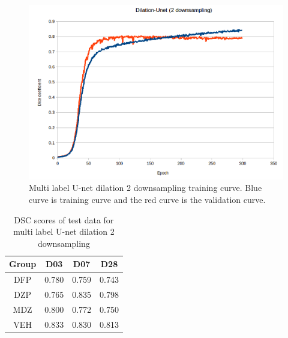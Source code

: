 \begin{figure}[!tbh]
\centering
\includegraphics[width=\textwidth]{results/train_results_multi_unetdil2.png}
\caption{Multi label U-net dilation 2 downsampling training curve. Blue curve is training curve and the red curve is the validation curve. }
\label{fig:results_multi_unetdil2_train}
\end{figure}

\begin{table}[tbh]
\renewcommand{\arraystretch}{1}
\centering
\begin{tabular}{|c|c|c|c|}
\hline
\textbf{Group} & \textbf{D03}& \textbf{D07}& \textbf{D28}\\
\hline
DFP & 0.780 & 0.759 & 0.743\\      
\hline
DZP & 0.765 & 0.835 & 0.798\\
\hline
MDZ & 0.800 & 0.772 & 0.750\\ 
\hline
VEH & 0.833 & 0.830 & 0.813\\ 
\hline
\end{tabular}
\caption{DSC scores of test data for multi label U-net dilation 2 downsampling}
\label{tab.multi_model_results_unetdil2}
\end{table}

